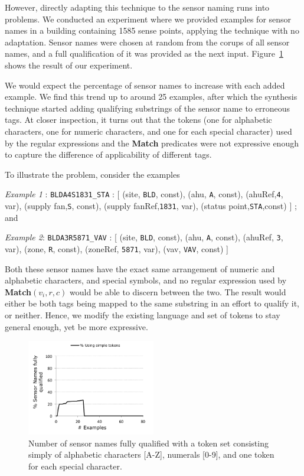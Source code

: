 However, directly adapting this technique to the sensor naming runs into problems. We conducted an experiment where we provided examples for sensor names in a building containing 1585 sense points, applying the technique with no adaptation. Sensor names were chosen at random from the corups of all sensor names, and a full qualification of it was provided as the next input. Figure~\ref{fig:simpleTokenNoCoverage} shows the result of our experiment.

We would expect the percentage of sensor names to increase with each added example. We find this trend up to around 25 examples, after which the synthesis technique started adding qualifying substrings of the sensor name to erroneous tags. At closer inspection, it turns out that the tokens  (one for alphabetic characters, one for numeric characters, and one for each special character) used by the regular expressions and the {\bf Match} predicates were not expressive enough to capture the difference of applicability of different tags. 

To illustrate the problem, consider the examples 

{\it Example 1} : \texttt{BLDA4S1831\_STA} : [ (site, \texttt{BLD}, const), (ahu, \texttt{A}, const), (ahuRef,\texttt{4}, var), (supply fan,\texttt{S}, const), (supply fanRef,\texttt{1831}, var), (status point,\texttt{STA},const) ] ; and 

{\it Example 2}: \texttt{BLDA3R5871\_VAV} : [ (site, \texttt{BLD}, const), (ahu, \texttt{A}, const), (ahuRef, \texttt{3}, var), (zone, \texttt{R}, const), (zoneRef, \texttt{5871}, var), (vav, \texttt{VAV}, const) ]

Both these sensor names have the exact same arrangement of numeric and alphabetic characters, and special symbols, and no regular expression used by {\bf Match}$(v_i,r,c)$  would be able to discern between the two. The result would either be both tags being mapped to the same substring in an effort to qualify it, or neither. Hence, we modify the existing language and set of tokens to stay general enough, yet be more expressive.

\begin{figure}[h!]
  
  \centering
    \includegraphics[width=0.5\textwidth]{figs/gulwani-noconverge.pdf}
\caption{Number of sensor names fully qualified with a token set consisting simply of alphabetic characters [A-Z], numerals [0-9], and one token for each special character.}
\label{fig:simpleTokenNoCoverage}
\end{figure}

